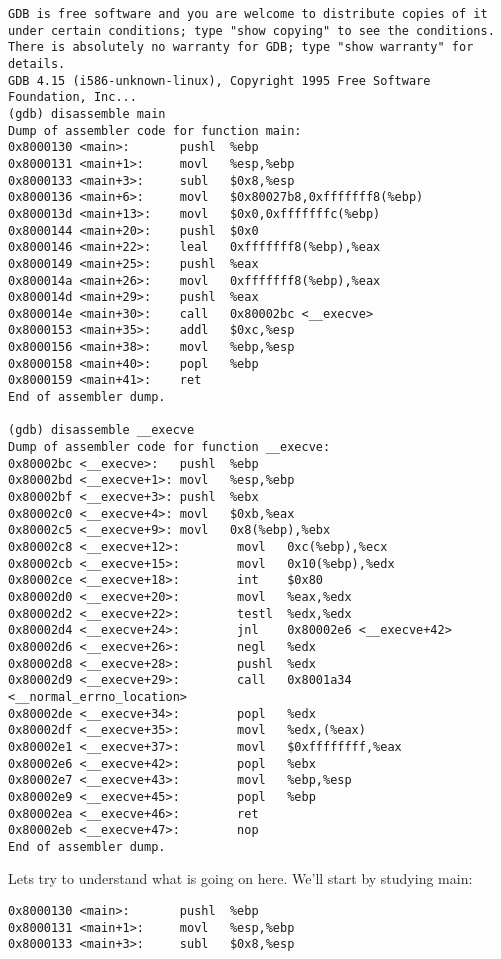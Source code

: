 \documentclass[a4paper]{article}
\begin{document}
\begin{verbatim}
GDB is free software and you are welcome to distribute copies of it
under certain conditions; type "show copying" to see the conditions.
There is absolutely no warranty for GDB; type "show warranty" for details.
GDB 4.15 (i586-unknown-linux), Copyright 1995 Free Software Foundation, Inc...
(gdb) disassemble main
Dump of assembler code for function main:
0x8000130 <main>:       pushl  %ebp
0x8000131 <main+1>:     movl   %esp,%ebp
0x8000133 <main+3>:     subl   $0x8,%esp
0x8000136 <main+6>:     movl   $0x80027b8,0xfffffff8(%ebp)
0x800013d <main+13>:    movl   $0x0,0xfffffffc(%ebp)
0x8000144 <main+20>:    pushl  $0x0
0x8000146 <main+22>:    leal   0xfffffff8(%ebp),%eax
0x8000149 <main+25>:    pushl  %eax
0x800014a <main+26>:    movl   0xfffffff8(%ebp),%eax
0x800014d <main+29>:    pushl  %eax
0x800014e <main+30>:    call   0x80002bc <__execve>
0x8000153 <main+35>:    addl   $0xc,%esp
0x8000156 <main+38>:    movl   %ebp,%esp
0x8000158 <main+40>:    popl   %ebp
0x8000159 <main+41>:    ret
End of assembler dump.

(gdb) disassemble __execve
Dump of assembler code for function __execve:
0x80002bc <__execve>:   pushl  %ebp
0x80002bd <__execve+1>: movl   %esp,%ebp
0x80002bf <__execve+3>: pushl  %ebx
0x80002c0 <__execve+4>: movl   $0xb,%eax
0x80002c5 <__execve+9>: movl   0x8(%ebp),%ebx
0x80002c8 <__execve+12>:        movl   0xc(%ebp),%ecx
0x80002cb <__execve+15>:        movl   0x10(%ebp),%edx
0x80002ce <__execve+18>:        int    $0x80
0x80002d0 <__execve+20>:        movl   %eax,%edx
0x80002d2 <__execve+22>:        testl  %edx,%edx
0x80002d4 <__execve+24>:        jnl    0x80002e6 <__execve+42>
0x80002d6 <__execve+26>:        negl   %edx
0x80002d8 <__execve+28>:        pushl  %edx
0x80002d9 <__execve+29>:        call   0x8001a34 <__normal_errno_location>
0x80002de <__execve+34>:        popl   %edx
0x80002df <__execve+35>:        movl   %edx,(%eax)
0x80002e1 <__execve+37>:        movl   $0xffffffff,%eax
0x80002e6 <__execve+42>:        popl   %ebx
0x80002e7 <__execve+43>:        movl   %ebp,%esp
0x80002e9 <__execve+45>:        popl   %ebp
0x80002ea <__execve+46>:        ret
0x80002eb <__execve+47>:        nop
End of assembler dump.
\end{verbatim}

Lets try to understand what is going on here. We’ll start by studying main:

\begin{verbatim}
0x8000130 <main>:       pushl  %ebp
0x8000131 <main+1>:     movl   %esp,%ebp
0x8000133 <main+3>:     subl   $0x8,%esp
\end{verbatim}
\end{document}
